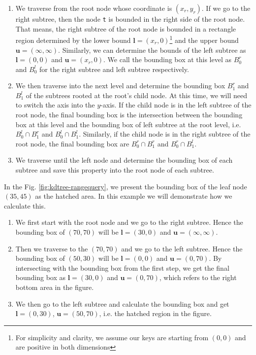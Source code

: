 \begin{enumerate}
	\item We traverse from the root node whose coordinate is $(x_r, y_r)$. If we go to the right subtree, then the node \texttt{t} is bounded in the right side of the root node. That means, the right subtree of the root node is bounded in a rectangle region determined by the lower bound $\boldsymbol{l}=(x_r, 0)$\footnote{For simplicity and clarity, we assume our keys are starting from $(0,0)$ and are positive in both dimensions} and the upper bound $\boldsymbol{u}=(\infty, \infty)$. Similarly, we can determine the bounds of the left subtree as $\boldsymbol{l}=(0, 0)$ and $\boldsymbol{u}=(x_r, 0)$. We call the bounding box at this level as $B_0^r$ and $B_0^l$ for the right subtree and left subtree respectively.
	\item We then traverse into the next level and determine the bounding box $B_1^r$ and $B_1^l$ of the subtrees rooted at the root's child node. At this time, we will need to switch the axis into the $y$-axis. If the child node is in the left subtree of the root node, the final bounding box is the intersection between the bounding box at this level and the bounding box of left subtree at the root level, i.e. $B_0^l\cap B_1^r$ and $B_0^l\cap B_1^l$. Similarly, if the child node is in the right subtree of the root node, the final bounding box are $B_0^r\cap B_1^r$ and $B_0^r\cap B_1^l$.
	\item We traverse until the left node and determine the bounding box of each subtree and save this property into the root node of each subtree.
\end{enumerate}

\begin{mscexample}
	In the Fig. \ref{fig:kdtree-rangequery}, we present the bounding box of the leaf node $(35, 45)$ as the hatched area. In this example we will demonstrate how we calculate this.
	\begin{enumerate}
		\item We first start with the root node and we go to the right subtree. Hence the bounding box of $(70,70)$ will be $\boldsymbol{l}=(30,0)$ and $\boldsymbol{u}=(\infty, \infty)$.
		\item Then we traverse to the $(70, 70)$ and we go to the left subtree. Hence the bounding box of $(50,30)$ will be $\boldsymbol{l}=(0,0)$ and $\boldsymbol{u}=(0, 70)$. By intersecting with the bounding box from the first step, we get the final bounding box as $\boldsymbol{l}=(30,0)$ and $\boldsymbol{u}=(0, 70)$, which refers to the right bottom area in the figure.
		\item We then go to the left subtree and calculate the bounding box and get $\boldsymbol{l}=(0,30)$, $\boldsymbol{u}=(50, 70)$, i.e. the hatched region in the figure.
	\end{enumerate}
\end{mscexample}

